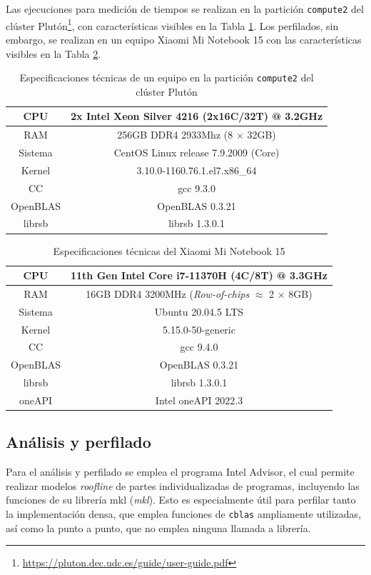 Las ejecuciones para medición de tiempos se realizan en la partición \texttt{compute2} del clúster Plutón\footnote{\url{https://pluton.dec.udc.es/guide/user-guide.pdf}}, con características visibles en la Tabla \ref{tb:especificaciones_compute2}. Los perfilados, sin embargo, se realizan en un equipo Xiaomi Mi Notebook 15 con las características visibles en la Tabla \ref{tb:especificaciones_xiaomi}.
\begin{table}
    \centering
    \begin{tabular}{|c|c|}
        \hline
        CPU & 2x Intel Xeon Silver 4216 (2x16C/32T) @ 3.2GHz\\\hline
        RAM & 256GB DDR4 2933Mhz (8 $\times$ 32GB)\\\hline
        Sistema & CentOS Linux release 7.9.2009 (Core) \\\hline
        Kernel & 3.10.0-1160.76.1.el7.x86\_64 \\\hline
        CC & gcc 9.3.0\\\hline
        OpenBLAS & OpenBLAS 0.3.21\\\hline
        librsb & librsb 1.3.0.1\\\hline
    \end{tabular}
    \caption{\label{tb:especificaciones_compute2}Especificaciones técnicas de un equipo en la partición \texttt{compute2} del clúster Plutón}
    \end{table}

\begin{table}
\centering
\begin{tabular}{|c|c|}
    \hline
    CPU & 11th Gen Intel Core i7-11370H (4C/8T) @ 3.3GHz\\\hline
    RAM & 16GB DDR4 3200MHz (\textit{Row-of-chips} {\small$\approx$} 2 $\times$ 8GB)\\\hline
    Sistema & Ubuntu 20.04.5 LTS\\\hline
    Kernel & 5.15.0-50-generic \\\hline
    CC & gcc 9.4.0\\\hline
    OpenBLAS & OpenBLAS 0.3.21\\\hline
    librsb & librsb 1.3.0.1\\\hline
    oneAPI & Intel oneAPI 2022.3\\\hline
\end{tabular}
\caption{\label{tb:especificaciones_xiaomi}Especificaciones técnicas del Xiaomi Mi Notebook 15}
\end{table}


\subsection{Análisis y perfilado}
\label{ssec:analisis_perfilado_metodologia}
Para el análisis y perfilado se emplea el programa Intel Advisor, el cual permite realizar modelos \textit{roofline} de partes individualizadas de programas, incluyendo las funciones de su librería \acrshort{mkl} (\textit{\acrlong{mkl}}). Esto es especialmente útil para perfilar tanto la implementación densa, que emplea funciones de \texttt{cblas} ampliamente utilizadas, así como la punto a punto, que no emplea ninguna llamada a librería.

